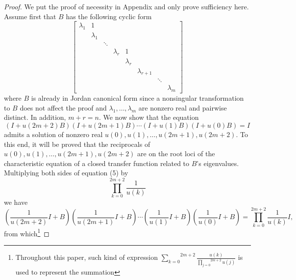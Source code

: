 \documentclass[journal,a4paper,12pt,onecolumn]{IEEEtran}
\begin{document}
\begin{proof}
We put the proof of necessity in Appendix and only prove sufficiency here.
Assume first that $B$ has the following cyclic form\begin{equation}
\left[
\begin{array}{cccccccc}
\lambda _{1} & 1 &  &  &  &  &  &  \\
& \lambda _{1} &  &  &  &  &  &  \\
&  & \ddots &  &  &  &  &  \\
&  &  & \lambda _{r} & 1 &  &  &  \\
&  &  &  & \lambda _{r} &  &  &  \\
&  &  &  &  & \lambda _{r+1} &  &  \\
&  &  &  &  &  & \ddots &  \\
&  &  &  &  &  &  & \lambda _{m}\end{array}\right]
\end{equation}where $B$ is already in Jordan canonical form since a nonsingular
transformation to $B$ does not affect the proof and $\lambda _{1},\ldots
,\lambda _{m}$ are nonzero real and pairwise distinct. In addition, $m+r=n$.
We now show that the equation\begin{equation}
\left( I+u\left( 2m+2\right) B\right) \left( I+u\left( 2m+1\right) B\right)
\cdots \left( I+u\left( 1\right) B\right) \left( I+u\left( 0\right) B\right)
=I
\end{equation}admits a solution of nonzero real $u\left( 0\right) ,u\left( 1\right)
,\ldots ,u\left( 2m+1\right) ,u\left( 2m+2\right) $. To this end, it will be
proved that the reciprocals of $u\left( 0\right) ,u\left( 1\right) ,\ldots
,u\left( 2m+1\right) ,u\left( 2m+2\right) $ are on the root loci of the
characteristic equation of a closed transfer function related to $B$'s
eigenvalues. Multiplying both sides of equation (5) by\begin{equation*}
\overset{2m+2}{\underset{k=0}{\prod }}\frac{1}{u\left( k\right) }
\end{equation*}we have\begin{equation}
\left( \frac{1}{u\left( 2m+2\right) }I+B\right) \left( \frac{1}{u\left(
2m+1\right) }I+B\right) \cdots \left( \frac{1}{u\left( 1\right) }I+B\right)
\left( \frac{1}{u\left( 0\right) }I+B\right) =\overset{2m+2}{\underset{k=0}{\prod }}\frac{1}{u\left( k\right) }I,
\end{equation}from which\footnote{Throughout this paper, such kind of expression $\overset{2m+2}{\underset{k=0}{\sum }}\frac{u\left( k\right) }{\overset{2m+2}{\underset{j=0}{\prod }}u\left( j\right) }$ is used to represent the summation
}
\end{proof}
\end{document}
